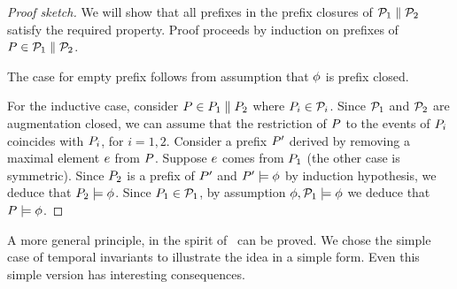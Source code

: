 \begin{proof}[Proof sketch]
  We will show that all prefixes in the prefix closures of
  $\mathcal{P}_1 \parallel \mathcal{P}_2$ satisfy the required property.  Proof proceeds
  by induction on prefixes of $P \in \mathcal{P}_1 \parallel \mathcal{P}_2$.

  The case for empty prefix  follows from assumption that  $\phi$ is prefix closed.  

  For the inductive case, consider %
  $P \in P_1 \parallel P_2$ where
  $P_i \in \mathcal{P}_i$.  Since $\mathcal{P}_1$ and $\mathcal{P}_2$ are augmentation
  closed, we can assume that the restriction of $P$ to the events of
  $P_i$ coincides with $P_i$, for $i=1,2$.
  Consider a prefix $P'$ derived by removing a maximal element $e$ from
  $P$.  Suppose $e$ comes from $P_1$ (the other case is
  symmetric). Since $P_2$ is a prefix of $P'$ and $P' \models \phi$
  by induction hypothesis, we deduce that $P_2 \models \phi$.
  Since $P_1 \in \mathcal{P}_1$, by assumption $\phi, \mathcal{P}_1 \models\phi$ we
  deduce that $P \models \phi$.
\end{proof}

A more general principle, in the spirit of~\citet{Abadi:1993:CS:151646.151649} can be proved.  We chose the simple case of temporal invariants to illustrate the idea in a simple form.  Even this simple version has interesting consequences. 

